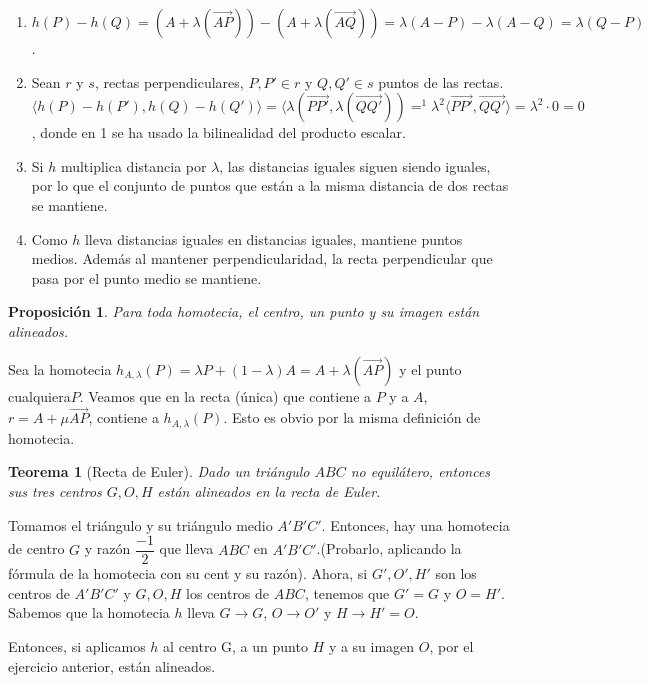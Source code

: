 \documentclass[11pt, a4paper]{article}
\makeatletter
\newif\IfInSansMode
\let\oldsf\sffamily
\renewcommand*{\sffamily}{\oldsf\mathversion{sans}\InSansModetrue}
\let\oldnorm\normalfont
\renewcommand*{\normalfont}{\oldnorm\InSansModefalse\mathversion{normal}}
\renewenvironment{proof}[1][\proofname] {\vspace{-15pt}\par\pushQED{\qed}\normalfont\topsep6\p@\@plus6\p@\relax\trivlist\item[\hskip\labelsep\it#1\@addpunct{.}]\ignorespaces}{\popQED\endtrivlist\@endpefalse}
\renewcommand{\vec}{\overrightarrow}
\renewenvironment{proof}[1][\proofname] {\par\pushQED{\qed}\normalfont\topsep6\p@\@plus6\p@\relax\trivlist\item[\hskip\labelsep\itshape\sffamily#1\@addpunct{.}]\ignorespaces}{\popQED\endtrivlist\@endpefalse}
\theoremstyle{theorem-style}
\newtheorem{nth}{Teorema}[section]
\newtheorem{nprop}{Proposición}[section]
\theoremstyle{definition-style}
\theoremstyle{remark-style}
\theoremstyle{example-style}
\makeatother
\begin{document}
\begin{proof}\hfill
\begin{enumerate}
	\item $h(P)-h(Q)=(A+\lambda(\vec{AP})) -(A+\lambda(\vec{AQ})) = \lambda(A-P) - \lambda(A-Q) = \lambda (Q-P)$.
	\item  Sean $r$ y $ s$, rectas perpendiculares, $P,P' \in r$ y $Q,Q'\in s$ puntos de las rectas. $\langle h(P) - h(P'),h(Q) - h(Q')\rangle  =  \langle \lambda (\vec{PP'}, \lambda(\vec {QQ'}))=^1 \lambda^2 \langle \vec{PP'},\vec{QQ'}\rangle  = \lambda^2 \cdot 0 = 0 $, donde en 1 se ha usado la bilinealidad del producto escalar.
	\item Si $h$ multiplica distancia por $\lambda$, las distancias iguales siguen siendo iguales, por lo que el conjunto de puntos que están a la misma distancia de dos rectas se mantiene.
	\item Como $h$ lleva distancias iguales en distancias iguales, mantiene puntos medios. Además al mantener perpendicularidad, la recta perpendicular que pasa por el punto medio se mantiene.
\end{enumerate}
\end{proof}


\begin{nprop}
	
Para toda homotecia, el centro, un punto y su imagen están alineados.
\end{nprop}

\begin{proof}
	Sea la homotecia $h_{A,\lambda}(P) = \lambda P + (1-\lambda)A = A+\lambda(\vec{AP})$ y el punto cualquiera$P$. Veamos que en la recta (única) que contiene a $P$ y a $ A$, $r= A + \mu \vec{AP}$,  contiene a $h_{A,\lambda} (P)$. Esto es obvio por la misma definición de homotecia.	
\end{proof}


\begin{nth}[Recta de Euler]
  Dado un triángulo $ABC$ no equilátero, entonces sus tres centros $G,O,H$ están alineados en la recta de Euler.
\end{nth}
\begin{proof}
  Tomamos el triángulo y su triángulo medio $A'B'C'$. Entonces, hay una homotecia de centro $G$ y razón $\dfrac{-1}{2}$ que lleva $ABC$ en $A'B'C'$.(Probarlo, aplicando la fórmula de la homotecia con su cent y su razón). 
  Ahora, si $G',O',H'$ son los centros de $A'B'C'$ y $G,O,H$ los centros de $ABC$, tenemos que $G'=G$ y $O=H'$. Sabemos que la homotecia $h$ lleva $G \to G$, $O \to O'$ y $H \to H' = O$.
  
  Entonces, si aplicamos $h$ al centro G, a un punto $H$ y a su imagen $O$, por el ejercicio anterior, están alineados.
  
\end{proof}
\end{document}
